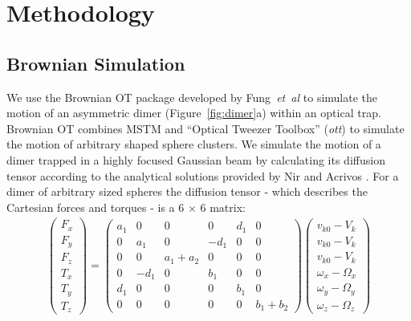 \documentclass[final,  3p]{elsarticle}
\begin{document}
\printnomenclature[0.55in]

\section{Methodology}
\label{sec:Method}

\subsection{Brownian Simulation}
\label{sec:brownian}

We use the Brownian OT package developed by Fung~\textit{et~al} \cite{Vigilante2020Brownian_OT} to simulate the motion of an asymmetric dimer (Figure~\ref{fig:dimer}a) within an optical trap. Brownian OT combines MSTM \cite{Mishchenko1996MSTM} and ``Optical Tweezer Toolbox'' (\textit{ott}) \cite{Lenton2020} to simulate the motion of arbitrary
shaped sphere clusters. We simulate the motion of a dimer trapped in a highly focused Gaussian beam by calculating its diffusion tensor according to the analytical solutions provided by Nir and Acrivos \cite{nir_acrivos_1973}. For a dimer of arbitrary sized spheres the diffusion tensor - which describes the Cartesian forces and torques - is a 6 $\times$ 6 matrix:
\begin{align}
	\begin{pmatrix}
		F_x \\ F_y \\ F_z \\ T_x \\ T_y \\ T_z 
	\end{pmatrix}
	= \begin{pmatrix}
	a_1 &   0  &     0     &   0  & d_1 &     0 \\
	 0  &  a_1 &     0     & -d_1 &  0  &     0 \\
	 0  &   0  & a_1 + a_2 &   0  &  0  &     0 \\
	 0  & -d_1 &     0     &  b_1 &  0  &     0 \\
	d_1 &   0  &     0     &   0  & b_1 &     0 \\
	 0  &   0  &     0     &   0  &  0  & b_1 + b_2     
	\end{pmatrix}
	\begin{pmatrix}
		v_{k0} - V_k \\ v_{k0} - V_k \\ v_{k0} - V_k \\
		\omega_x - \Omega_x \\ \omega_y - \Omega_y \\ \omega_z - \Omega_z
	\end{pmatrix}
\end{align}
\end{document}
